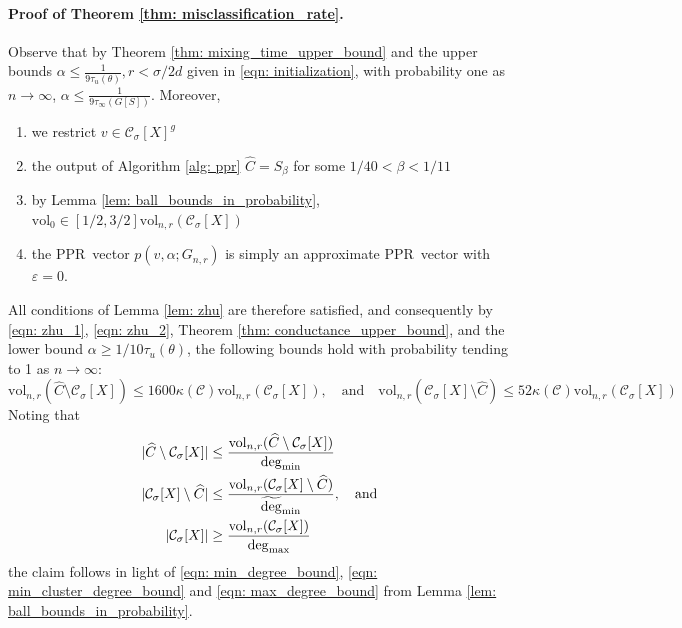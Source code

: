 \documentclass[11pt,twoside]{article}
\DeclarePairedDelimiter\abs{\lvert}{\rvert}
\newcommand{\vol}{\mathrm{vol}}
\newcommand{\1}{\mathbf{1}}
\newcommand{\pbf}{p}        %
\newcommand{\Xbf}{X}             %
\newcommand{\Cset}{\mathcal{C}}
\newcommand{\Csig}{\Cset_{\sigma}}
\newcommand{\degminwt}{\widetilde{\deg}_{\min}}
\newcommand{\degmax}{\deg_{\max}}
\newcommand{\degmin}{\deg_{\min}}
\newcommand{\pprspace}{{\sc PPR~}}
\begin{document}
\paragraph{Proof of Theorem \ref{thm: misclassification_rate}.}

Observe that by Theorem \ref{thm: mixing_time_upper_bound} and the upper bounds $\alpha \leq \frac{1}{9 \tau_u(\theta)}, r < \sigma/2d$ given in \eqref{eqn: initialization}, with probability one as $n \to \infty$, $\alpha \leq \frac{1}{9\tau_{\infty}(G[S])}$. Moreover, 
\begin{enumerate}[\text{(i)}]
	\item we restrict $v \in \Csig[\Xbf]^g$
	\item the output of Algorithm \ref{alg: ppr} $\widehat{C} = S_{\beta}$ for some $1/40 < \beta < 1/11$
	\item by Lemma \ref{lem: ball_bounds_in_probability}, $\vol_0 \in [1/2,3/2]\vol_{n,r}(\Csig[\Xbf])$
	\item the \pprspace vector $\pbf(v,\alpha;G_{n,r})$ is simply an approximate \pprspace vector with $\varepsilon = 0$.
\end{enumerate}

All conditions of Lemma \ref{lem: zhu} are therefore satisfied, and consequently by \eqref{eqn: zhu_1}, \eqref{eqn: zhu_2}, Theorem \ref{thm: conductance_upper_bound}, and the lower bound $\alpha \geq 1/10\tau_u(\theta)$, the following bounds hold with probability tending to 1 as $n \to \infty$:
\begin{equation*}
\vol_{n,r}(\widehat{C} \setminus \Csig[\Xbf]) \leq 1600 \kappa(\Cset) \vol_{n,r}(\Csig[\Xbf]), \quad \textrm{and} \quad  \vol_{n,r}(\Csig[\Xbf] \setminus \widehat{C}) \leq 52 \kappa(\Cset) \vol_{n,r}(\Csig[\Xbf])
\end{equation*}
Noting that
\begin{align*}
\abs{\widehat{C} \setminus \Csig[\Xbf]} & \leq \frac{\vol_{n,r}(\widehat{C} \setminus \Csig[\Xbf])}{\degmin}   \\
\abs{\Csig[\Xbf] \setminus \widehat{C}} & \leq \frac{\vol_{n,r}(\Csig[\Xbf] \setminus \widehat{C})}{\degminwt}, \quad \textrm{and} \\
\abs{\Csig[\Xbf]} & \geq \frac{\vol_{n,r}(\Csig[\Xbf])}{\degmax}
\end{align*}
the claim follows in light of \eqref{eqn: min_degree_bound}, \eqref{eqn: min_cluster_degree_bound} and \eqref{eqn: max_degree_bound} from Lemma \ref{lem: ball_bounds_in_probability}.
\end{document}

